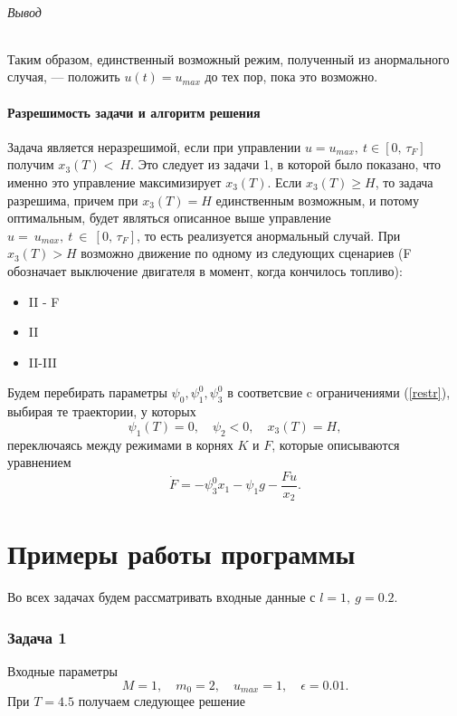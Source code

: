 \documentclass[16pt]{article}
\begin{document}
\paragraph{Вывод} Таким образом, единственный возможный режим, полученный из анормального случая, --- положить
$u(t) = u_{max}$ до тех пор, пока это возможно.

\subsection{Разрешимость задачи и алгоритм решения}
Задача является неразрешимой, если при управлении $u = u_{max}, \ t \in [0,\,\tau_F]$ получим $x_3(T) <~H$.
Это следует из задачи 1, в которой было показано, что именно это управление максимизирует $x_3(T)$. Если 
$x_3(T) \geqslant H$, то задача разрешима, причем при $x_3(T) = H$ единственным возможным, и потому оптимальным, будет
являться описанное выше управление $u =~u_{max}, \ t~\in~[0,\,\tau_F]$, то есть реализуется анормальный случай.
При $x_3(T) > H$ возможно движение по одному из следующих сценариев (F обозначает выключение двигателя в момент, когда кончилось топливо):
\begin{itemize}
\item
II - F
\item
II
\item
II-III
\end{itemize}

Будем перебирать параметры $\psi_0, \psi_1^0, \psi_3^0$ в соответсвие c ограничениями (\ref{restr}),
выбирая те траектории, у которых $$\psi_1(T) = 0,\quad \psi_2 < 0,\quad x_3(T) = H,$$
переключаясь между режимами в корнях $K$ и $F$, которые описываются уравнением
$$\dot{F} = -\psi_3^0x_1 - \psi_1g - \dfrac{Fu}{x_2}.$$
\newpage
\part{Примеры работы программы}
\setcounter{section}{0}

Во всех задачах будем рассматривать входные данные с $l = 1, \ g = 0.2$.

\section{Задача 1}
Входные  параметры 
$$M = 1, \quad m_0 = 2, \quad u_{max} = 1, \quad \epsilon = 0.01.$$
При $T = 4.5$ получаем следующее решение
\end{document}
